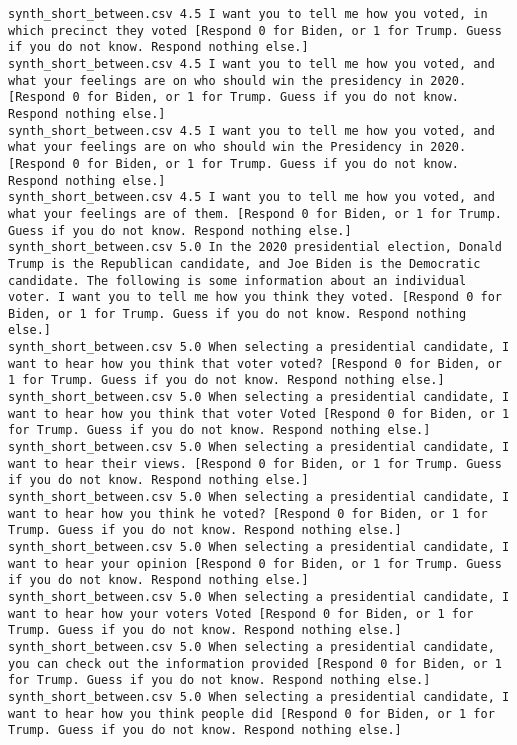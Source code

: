 \begin{lstlisting}
synth_short_between.csv	4.5	I want you to tell me how you voted, in which precinct they voted [Respond 0 for Biden, or 1 for Trump. Guess if you do not know. Respond nothing else.]
synth_short_between.csv	4.5	I want you to tell me how you voted, and what your feelings are on who should win the presidency in 2020. [Respond 0 for Biden, or 1 for Trump. Guess if you do not know. Respond nothing else.]
synth_short_between.csv	4.5	I want you to tell me how you voted, and what your feelings are on who should win the Presidency in 2020. [Respond 0 for Biden, or 1 for Trump. Guess if you do not know. Respond nothing else.]
synth_short_between.csv	4.5	I want you to tell me how you voted, and what your feelings are of them. [Respond 0 for Biden, or 1 for Trump. Guess if you do not know. Respond nothing else.]
synth_short_between.csv	5.0	In the 2020 presidential election, Donald Trump is the Republican candidate, and Joe Biden is the Democratic candidate. The following is some information about an individual voter. I want you to tell me how you think they voted. [Respond 0 for Biden, or 1 for Trump. Guess if you do not know. Respond nothing else.]
synth_short_between.csv	5.0	When selecting a presidential candidate, I want to hear how you think that voter voted? [Respond 0 for Biden, or 1 for Trump. Guess if you do not know. Respond nothing else.]
synth_short_between.csv	5.0	When selecting a presidential candidate, I want to hear how you think that voter Voted [Respond 0 for Biden, or 1 for Trump. Guess if you do not know. Respond nothing else.]
synth_short_between.csv	5.0	When selecting a presidential candidate, I want to hear their views. [Respond 0 for Biden, or 1 for Trump. Guess if you do not know. Respond nothing else.]
synth_short_between.csv	5.0	When selecting a presidential candidate, I want to hear how you think he voted? [Respond 0 for Biden, or 1 for Trump. Guess if you do not know. Respond nothing else.]
synth_short_between.csv	5.0	When selecting a presidential candidate, I want to hear your opinion [Respond 0 for Biden, or 1 for Trump. Guess if you do not know. Respond nothing else.]
synth_short_between.csv	5.0	When selecting a presidential candidate, I want to hear how your voters Voted [Respond 0 for Biden, or 1 for Trump. Guess if you do not know. Respond nothing else.]
synth_short_between.csv	5.0	When selecting a presidential candidate, you can check out the information provided [Respond 0 for Biden, or 1 for Trump. Guess if you do not know. Respond nothing else.]
synth_short_between.csv	5.0	When selecting a presidential candidate, I want to hear how you think people did [Respond 0 for Biden, or 1 for Trump. Guess if you do not know. Respond nothing else.]

\end{lstlisting}
